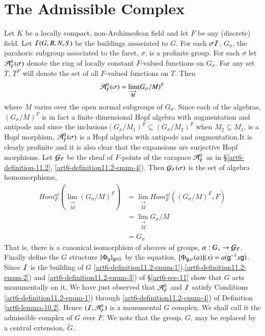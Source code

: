 \section*{The Admissible Complex}
Let $K$ be a locally compact, non-Archimedean field and let $F$ be any (discrete) field. Let $\mathcal{I}(G, B, N, S)$ be the buildings associated to $G$. For each $\sigma \mathcal{I}$, $G_{\sigma}$, the parahoric subgroup associated to the facet, $\sigma$, is a profinite group. For each $\sigma$ let $\mathcal{A}_{F}^{0}(\sigma)$ denote the ring of locally constant $F$-valued functions on $G_{\sigma}$. For any set $T$, $T^{F}$ will denote the set of all $F$-valued functions on $T$. Then
$$
\mathcal{A}_{F}^{0}(\sigma) = \lim\limits_{\substack{\longrightarrow \\ M}}(G_\sigma/M)^{F} 
$$
where $M$ varies over the open normal subgroups of $G_{\sigma}$. Since each of the algebras, $(G_{\sigma}/M)^{F}$ is in fact a finite dimensional Hopf algebra with augmentation and antipode and since the inclusions$(G_{\sigma}/M_{1})^{F}\subseteq (G_{\sigma}/M_{2})^{F}$ when $M_{2} \subseteq M_{1}$, is a Hopf morphism, $\mathcal{A}_{F}^{0}(\sigma)$ is a Hopf algebra with antipode and augmentation.It is clearly profinite and it is also clear that the expansions are surjective Hopf morphisms. Let $\mathcal{G}_{F}$ be the sheaf of $F$-points of the carapace $\mathcal{A}_{F}^{0}$ as in \S\ref{art6-definition-11.2}, \ref{art6-definition11.2-enum-4}). Then $\mathcal{G}_{F}(\sigma)$ is the set of algebra homomorphisms,
\begin{align*}
Hom_{F}^{al}(\lim\limits_{\substack{\longrightarrow \\ M}}(G_\sigma/M)^{F}) &= \lim\limits_{\substack{\longrightarrow \\                                                  M}} Hom_{F}^{al}((G_{\sigma}/M)^{F}, F)\\
&=\lim\limits_{\substack{\longrightarrow \\ M}} G_{\sigma}/M\\
&=G_{\sigma}
\end{align*}
That is, there is a canonical isomorphism of sheaves of groups, $\alpha : G_{*} \rightarrow \mathcal{G}_{F}$. Finally define the $G$ structure $\{\Phi_{\mathsf{g}}\}_{\mathsf{g} \in G}$ by the equation, $[\Phi_{\mathsf{g}, \sigma}(a)](x) = a(\mathsf{g} ^{-1}x\mathsf{g})$. Since $\mathcal{I}$ is the building of $G$ \ref{art6-definition11.2-enum-1}),\ref{art6-definition11.2-enum-2}) and \ref{art6-definition11.2-enum-3}) of \S \ref{art6-sec-11} show that $G$ acts monumentally on it. We have just observed that $\mathcal{A}_{F}^{0}$ and $\mathcal{I}$ satisfy Conditions \ref{art6-definition11.2-enum-1}) through \ref{art6-definition11.2-enum-4}) of Definition \ref{art6-lemma-10.2}. Hence $(\mathcal{I}, \mathcal{A}_{F}^{0})$ is a monumental $G$ complex. We shall call it the admissible complex of $G$ over $F$. We note that the group. $G$, may be replaced by a central extension, $\tilde{G}$. 

